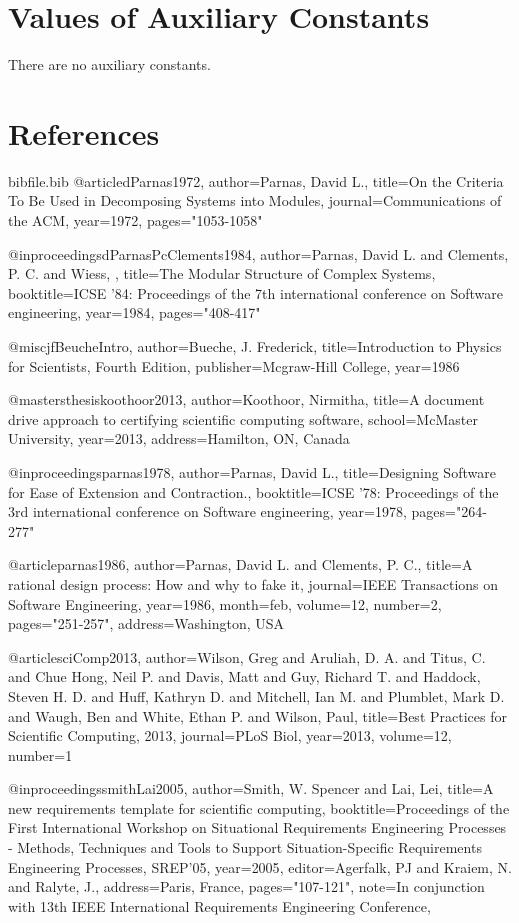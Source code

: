 \documentclass[12pt]{article}
\begin{document}
\section{Values of Auxiliary Constants}
\label{Sec:AuxConstants}
There are no auxiliary constants.
\section{References}
\label{Sec:References}
\begin{filecontents*}{bibfile.bib}
@article{dParnas1972,
author={Parnas, David L.},
title={On the Criteria To Be Used in Decomposing Systems into Modules},
journal={Communications of the ACM},
year={1972},
pages={"1053-1058"}}

@inproceedings{dParnasPcClements1984,
author={Parnas, David L. and Clements, P. C. and Wiess, },
title={The Modular Structure of Complex Systems},
booktitle={ICSE '84: Proceedings of the 7th international conference on Software engineering},
year={1984},
pages={"408-417"}}

@misc{jfBeucheIntro,
author={Bueche, J. Frederick},
title={Introduction to Physics for Scientists, Fourth Edition},
publisher={Mcgraw-Hill College},
year={1986}}

@mastersthesis{koothoor2013,
author={Koothoor, Nirmitha},
title={A document drive approach to certifying scientific computing software},
school={McMaster University},
year={2013},
address={Hamilton, ON, Canada}}

@inproceedings{parnas1978,
author={Parnas, David L.},
title={Designing Software for Ease of Extension and Contraction.},
booktitle={ICSE '78: Proceedings of the 3rd international conference on Software engineering},
year={1978},
pages={"264-277"}}

@article{parnas1986,
author={Parnas, David L. and Clements, P. C.},
title={A rational design process: How and why to fake it},
journal={IEEE Transactions on Software Engineering},
year={1986},
month={feb},
volume={12},
number={2},
pages={"251-257"},
address={Washington, USA}}

@article{sciComp2013,
author={Wilson, Greg and Aruliah, D. A. and Titus, C. and Chue Hong, Neil P. and Davis, Matt and Guy, Richard T. and Haddock, Steven H. D. and Huff, Kathryn D. and Mitchell, Ian M. and Plumblet, Mark D. and Waugh, Ben and White, Ethan P. and Wilson, Paul},
title={Best Practices for Scientific Computing, 2013},
journal={PLoS Biol},
year={2013},
volume={12},
number={1}}

@inproceedings{smithLai2005,
author={Smith, W. Spencer and Lai, Lei},
title={A new requirements template for scientific computing},
booktitle={Proceedings of the First International Workshop on Situational Requirements Engineering Processes - Methods, Techniques and Tools to Support Situation-Specific Requirements Engineering Processes, SREP'05},
year={2005},
editor={Agerfalk, PJ and Kraiem, N. and Ralyte, J.},
address={Paris, France},
pages={"107-121"},
note={In conjunction with 13th IEEE International Requirements Engineering Conference,}}
\end{filecontents*}
\nocite{*}
\printbibliography[heading=none]
\end{document}
